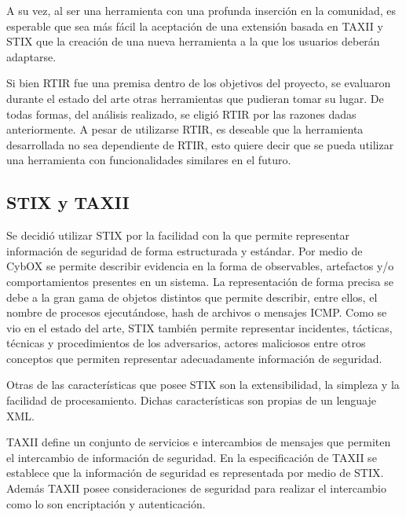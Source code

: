 \bigskip

	A su vez, al ser una herramienta con una profunda inserción en la comunidad, es esperable que sea más fácil la aceptación
	de una extensión basada en TAXII y STIX que la creación de una nueva herramienta a la que los usuarios deberán
	adaptarse.


\bigskip

	Si bien RTIR fue una premisa dentro de los objetivos del proyecto, se evaluaron durante el estado del arte otras
	herramientas que pudieran tomar su lugar. De todas formas, del análisis realizado, se eligió RTIR por las razones dadas
	anteriormente. A pesar de utilizarse RTIR, es deseable que la herramienta desarrollada no sea dependiente de RTIR, esto
	quiere decir que se pueda utilizar una herramienta con funcionalidades similares en el futuro.

\subsection{STIX y TAXII}

\bigskip

	Se decidió utilizar STIX por la facilidad con la que permite representar información de
	seguridad de forma estructurada y estándar. Por medio de CybOX se permite describir evidencia en la forma de
	observables, artefactos y/o comportamientos presentes en un sistema. La representación de forma precisa se debe a la
	gran gama de objetos distintos que permite describir, entre ellos, el nombre de procesos ejecutándose, hash de archivos
	o mensajes ICMP. Como se vio en el estado del arte, STIX también permite representar incidentes, tácticas, técnicas y
	procedimientos de los adversarios, actores maliciosos entre otros conceptos que permiten representar adecuadamente
	información de seguridad.


\bigskip

	Otras de las características que posee STIX son la extensibilidad, la simpleza y la facilidad de procesamiento. Dichas
	características son propias de un lenguaje XML.


\bigskip

	TAXII define un conjunto de servicios e intercambios de mensajes que permiten el intercambio de información de
	seguridad. En la especificación de TAXII se establece que la información de seguridad es representada por medio de
	STIX. Además TAXII posee consideraciones de seguridad para realizar el intercambio como lo son encriptación y
	autenticación.


